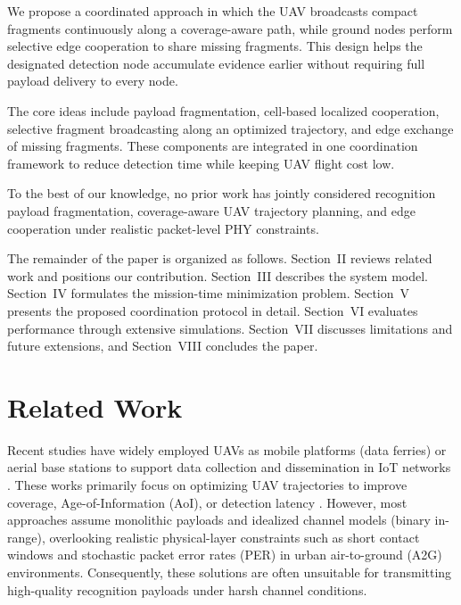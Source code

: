 \documentclass[conference]{IEEEtran}
\begin{document}
We propose a coordinated approach in which the UAV broadcasts compact fragments continuously along a coverage-aware path, while ground nodes perform selective edge cooperation to share missing fragments. This design helps the designated detection node accumulate evidence earlier without requiring full payload delivery to every node.


The core ideas include payload fragmentation, cell-based localized cooperation, selective fragment broadcasting along an optimized trajectory, and edge exchange of missing fragments. These components are integrated in one coordination framework to reduce detection time while keeping UAV flight cost low.

To the best of our knowledge, no prior work has jointly considered recognition payload fragmentation, coverage-aware UAV trajectory planning, and edge cooperation under realistic packet-level PHY constraints.

The remainder of the paper is organized as follows. Section~II reviews related work and positions our contribution. Section~III describes the system model. Section~IV formulates the mission-time minimization problem. Section~V presents the proposed coordination protocol in detail. Section~VI evaluates performance through extensive simulations. Section~VII discusses limitations and future extensions, and Section~VIII concludes the paper.

\section{Related Work}

Recent studies have widely employed UAVs as mobile platforms (data ferries) or aerial base stations to support data collection and dissemination in IoT networks \cite{wei2022uav,nguyen2021uav}. These works primarily focus on optimizing UAV trajectories to improve coverage, Age-of-Information (AoI), or detection latency \cite{liu2018age,abd2020deep}. However, most approaches assume monolithic payloads and idealized channel models (binary in-range), overlooking realistic physical-layer constraints such as short contact windows and stochastic packet error rates (PER) in urban air-to-ground (A2G) environments. Consequently, these solutions are often unsuitable for transmitting high-quality recognition payloads under harsh channel conditions.
\end{document}
